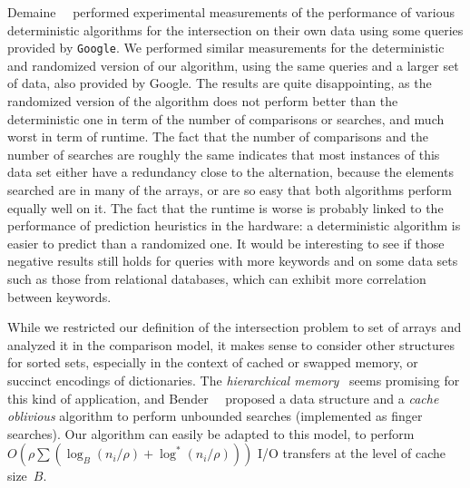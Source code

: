 Demaine~\etal~\cite{dlmAlenex} performed experimental measurements of
the performance of various deterministic algorithms for the
intersection on their own data using some queries provided by
\texttt{Google}.
%
We performed similar measurements for the deterministic and randomized
version of our algorithm, using the same queries and a larger set of
data, also provided by Google.
%
The results are quite disappointing, as the randomized version of the
algorithm does not perform better than the deterministic one in term
of the number of comparisons or searches, and much worst in term
of runtime.
%
The fact that the number of comparisons and the number of
searches are roughly the same indicates that most instances of
this data set either have a redundancy close to the alternation,
because the elements searched are in many of the arrays, or are so
easy that both algorithms perform equally well on it.
%
The fact that the runtime is worse is probably linked to the
performance of prediction heuristics in the hardware: a deterministic
algorithm is easier to predict than a randomized one.
%
It would be interesting to see if those negative results still holds
for queries with more keywords and on some data sets such as those
from relational databases, which can exhibit more correlation between
keywords.



While we restricted our definition of the intersection problem to set
of arrays and analyzed it in the comparison model, it makes sense to
consider other structures for sorted sets, especially in the context
of cached or swapped memory, or succinct encodings of
dictionaries.
%
The {\em hierarchical memory}~\cite{cacheObliviousAlgorithms} seems
promising for this kind of application, and
Bender~\etal~\cite{exponentialStructuresForEfficientCacheObliviousAlgorithms}
proposed a data structure and a {\em cache oblivious} algorithm to
perform unbounded searches (implemented as finger searches).
%
Our algorithm can easily be adapted to this model, to perform
$O(\rho\sum(\log_B(n_i/\rho)+\log^*(n_i/\rho)))$ I/O transfers at the
level of cache size~$B$.


